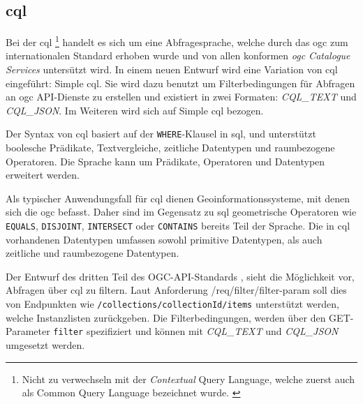 \subsection{\acl{cql}}


Bei der \acf{cql} \footnote{Nicht zu verwechseln mit der \textit{Contextual} Query Language, welche
  zuerst auch als Common Query Language bezeichnet wurde.
  \parencite{thelibraryofcongressCQLContextual2023, ZINGGentle2003}} handelt es sich um eine
Abfragesprache, welche durch das \ac{ogc} zum internationalen Standard erhoben wurde und von allen
konformen \textit{\ac{ogc} Catalogue Services} untersützt wird.  In
einem neuen Entwurf  wird eine Variation von \ac{cql} eingeführt: Simple
\ac{cql}. Sie wird dazu benutzt um Filterbedingungen für Abfragen an \ac{ogc} API-Dienste zu
erstellen und existiert in zwei Formaten: \textit{CQL\_TEXT} und \textit{CQL\_JSON}.  Im
Weiteren wird sich auf Simple \ac{cql} bezogen.

Der Syntax von \ac{cql} basiert auf der \texttt{WHERE}-Klausel in \acs{sql}, und unterstützt
boolesche Prädikate, Textvergleiche, zeitliche Datentypen und raumbezogene Operatoren. Die Sprache
kann um Prädikate, Operatoren und Datentypen erweitert werden.

Als typischer Anwendungsfall für \ac{cql} dienen Geoinformationssysteme, mit denen sich die \ac{ogc}
befasst. Daher sind im Gegensatz zu \ac{sql} geometrische Operatoren wie \texttt{EQUALS},
\texttt{DISJOINT}, \texttt{INTERSECT} oder \texttt{CONTAINS} bereits Teil der Sprache. Die in
\ac{cql} vorhandenen Datentypen umfassen sowohl primitive Datentypen, als auch zeitliche und
raumbezogene Datentypen.

Der Entwurf des dritten Teil des OGC-API-Standards , sieht die
Möglichkeit vor, Abfragen über \ac{cql} zu filtern. Laut Anforderung /req/filter/filter-param soll
dies von Endpunkten wie \texttt{/collections/{collectionId}/items} unterstützt werden, welche
Instanzlisten zurückgeben. Die Filterbedingungen, werden über den GET-Parameter \texttt{filter}
spezifiziert und können mit \textit{CQL\_TEXT} und \textit{CQL\_JSON} umgesetzt werden.

